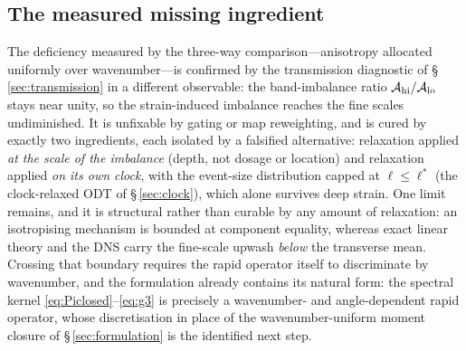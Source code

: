 \documentclass[lineno]{JFM-FLM_Au}
\begin{document}
\subsection{The measured missing ingredient}\label{sec:limits-endpoint}

The deficiency measured by the three-way comparison---anisotropy
allocated uniformly over wavenumber---is confirmed by the transmission
diagnostic of \S\,\ref{sec:transmission} in a different observable: the
band-imbalance ratio $\mathcal A_{\rm hi}/\mathcal A_{\rm lo}$ stays
near unity, so the strain-induced imbalance reaches the fine scales
undiminished. It is unfixable by gating or map reweighting, and is
cured by exactly two ingredients, each isolated by a falsified
alternative: relaxation applied \emph{at the scale of the imbalance}
(depth, not dosage or location) and relaxation applied \emph{on its
own clock}, with the event-size distribution capped at
$\ell\le\ell^{*}$ (the clock-relaxed ODT of \S\,\ref{sec:clock}),
which alone survives deep strain. One limit remains, and it is
structural rather than curable by any amount of relaxation: an
isotropising mechanism is bounded at component equality, whereas exact
linear theory and the DNS carry the fine-scale upwash \emph{below} the
transverse mean. Crossing that boundary requires the rapid operator
itself to discriminate by wavenumber, and the formulation already
contains its natural form: the spectral kernel
\eqref{eq:Piclosed}--\eqref{eq:g3} is precisely a wavenumber- and
angle-dependent rapid operator, whose discretisation in place of the
wavenumber-uniform moment closure of \S\,\ref{sec:formulation} is the
identified next step.
\end{document}
